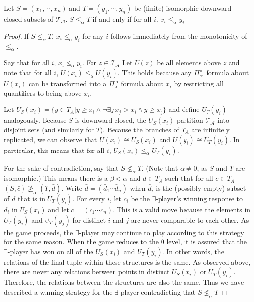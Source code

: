\documentclass[10pt,a4paper]{amsart}
\providecommand{\A}{\mathcal{A}}
\providecommand{\Pinf}[1]{\Pi^{\mathrm{in}}_{#1}}
\providecommand{\bc}{\bar c}
\providecommand{\bd}{\bar d}
\newcommand{\T}{{\mathcal{T}}}
\begin{document}
\begin{lemma}\label{lemma:factoring}
Let $S=(x_1,\cdots,x_n)$ and $T=(y_1,\cdots,y_n)$ be (finite) isomorphic
downward closed subsets of $\T_\A$.
$S\leq_\alpha T$ if and only if for all $i$, $x_i\leq_\alpha y_i$. 
\end{lemma}

\begin{proof}
If $S\leq_\alpha T$, $x_i\leq_\alpha y_i$ for any $i$ follows immediately from the monotonicity of $\leq_\alpha$.


Say that for all $i$, $x_i\leq_\alpha y_i$.
For $z\in \T_\A$ Let $U(z)$ be all elements above $z$ and note that
for all $i$, $U(x_i)\leq_\alpha U(y_i)$.
This holds because any $\Pinf{\alpha}$ formula about $U(x_i)$ can be transformed into a $\Pinf{\alpha}$ formula about $x_i$ by restricting all quantifiers to being above $x_i$.

Let $U_S(x_i) = \{y\in T_A\vert y\geq x_i \land \lnot\exists j ~ x_j>x_i \land y\geq x_j\}$ and define $U_T(y_i)$ analogously.
Because $S$ is downward closed, the $U_S(x_i)$ partition $\T_\A$ into disjoint sets (and similarly for $T$).
Because the branches of $T_A$ are infinitely replicated, we can observe that $U(x_i)\cong U_S(x_i)$ and $U(y_i)\cong U_T(y_i)$.
In particular, this means that for all $i$, $U_S(x_i)\leq_\alpha U_T(y_i)$.

For the sake of contradiction, say that $S\not\leq_\alpha T$.
(Note that $\alpha\neq0$, as $S$ and $T$ are isomorphic.)
This means there is a $\beta<\alpha$ and $\bd\in T_A$ such that for all $\bc\in T_A$
$(S,\bc)\not\geq_\alpha (T,\bd)$.
Write $\bd=(\bd_1\cdots\bd_n)$ when $\bd_i$ is the (possibly empty) subset of
$\bd$ that is in $U_T(y_i)$. For every $i$, let $\bc_i$ be the $\exists$-player's winning response to $\bd_i$ in $U_S(x_i)$ and let $\bc=(\bc_1\cdots \bc_n)$.
This is a valid move because the elements in  $U_T(y_i)$ and $U_T(y_j)$ for distinct $i$ and $j$ are never comparable to each other. 
As the game proceeds, the $\exists$-player may continue to play according to this strategy for the same reason.
When the game reduces to the $0$ level, it is assured that the $\exists$-player has won on all of the $U_S(x_i)$ and  $U_T(y_i)$.
In other words, the relations of the final tuple within these structures is the same.
As observed above, there are never any relations between points in distinct $U_S(x_i)$ or  $U_T(y_i)$.
Therefore, the relations between the structures are also the same.
Thus we have described a winning strategy for the $\exists$-player contradicting
that $S\not\leq_\alpha T$
\end{proof}
\end{document}
